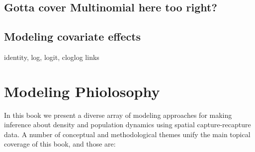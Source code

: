 \subsection{Gotta cover Multinomial here too right?}



\subsection{Modeling covariate effects}

identity, log, logit, cloglog links





\section{Modeling Phiolosophy}

In this book we present a diverse array of modeling approaches for making
inference about density and population dynamics using spatial
capture-recapture data. A number of conceptual and
methodological themes unify the main topical coverage of this book, and
those are:

